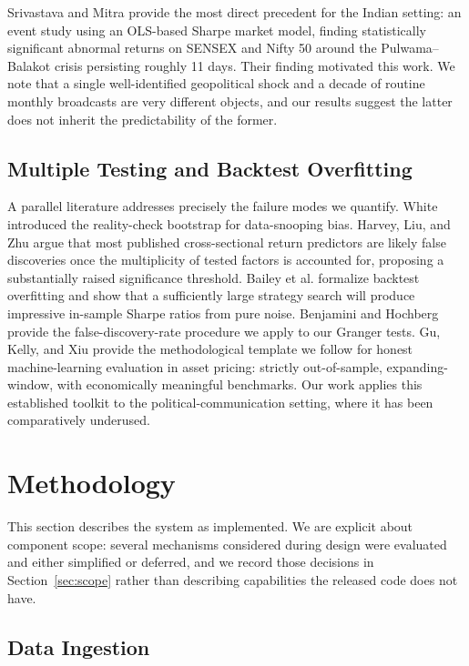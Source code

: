 \documentclass[11pt]{article}
\begin{document}
Srivastava and Mitra \cite{srivastava2019} provide the most direct precedent for the Indian setting: an event study using an OLS-based Sharpe market model, finding statistically significant abnormal returns on SENSEX and Nifty 50 around the Pulwama--Balakot crisis persisting roughly 11 days. Their finding motivated this work. We note that a single well-identified geopolitical shock and a decade of routine monthly broadcasts are very different objects, and our results suggest the latter does not inherit the predictability of the former.

\subsection{Multiple Testing and Backtest Overfitting}

A parallel literature addresses precisely the failure modes we quantify. White \cite{white2000} introduced the reality-check bootstrap for data-snooping bias. Harvey, Liu, and Zhu \cite{harvey2016} argue that most published cross-sectional return predictors are likely false discoveries once the multiplicity of tested factors is accounted for, proposing a substantially raised significance threshold. Bailey et al. \cite{bailey2014} formalize backtest overfitting and show that a sufficiently large strategy search will produce impressive in-sample Sharpe ratios from pure noise. Benjamini and Hochberg \cite{benjamini1995} provide the false-discovery-rate procedure we apply to our Granger tests. Gu, Kelly, and Xiu \cite{gu2020} provide the methodological template we follow for honest machine-learning evaluation in asset pricing: strictly out-of-sample, expanding-window, with economically meaningful benchmarks. Our work applies this established toolkit to the political-communication setting, where it has been comparatively underused.

\section{Methodology}
\label{sec:methodology}

This section describes the system as implemented. We are explicit about component scope: several mechanisms considered during design were evaluated and either simplified or deferred, and we record those decisions in Section~\ref{sec:scope} rather than describing capabilities the released code does not have.

\subsection{Data Ingestion}
\end{document}
